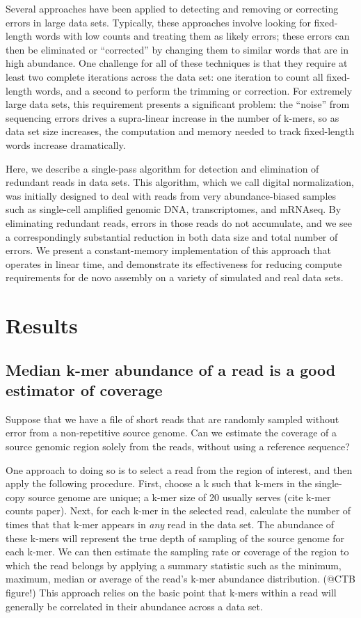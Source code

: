 \documentclass[10pt,draft]{article}
\begin{document}
Several approaches have been applied to detecting and removing or
correcting errors in large data sets.  Typically, these approaches
involve looking for fixed-length words with low counts and treating
them as likely errors; these errors can then be eliminated or
``corrected'' by changing them to similar words that are in high
abundance.  One challenge for all of these techniques is that they
require at least two complete iterations across the data set: one
iteration to count all fixed-length words, and a second to perform the
trimming or correction.  For extremely large data sets, this
requirement presents a significant problem: the ``noise'' from
sequencing errors drives a supra-linear increase in the number of
k-mers, so as data set size increases, the computation and memory
needed to track fixed-length words increase dramatically.

Here, we describe a single-pass algorithm for detection and
elimination of redundant reads in data sets.  This algorithm, which we
call digital normalization, was initially designed to deal with reads
from very abundance-biased samples such as single-cell amplified
genomic DNA, transcriptomes, and mRNAseq.  By eliminating redundant
reads, errors in those reads do not accumulate, and we see a
correspondingly substantial reduction in both data size and total
number of errors.  We present a constant-memory implementation of this
approach that operates in linear time, and demonstrate its
effectiveness for reducing compute requirements for de novo assembly
on a variety of simulated and real data sets.

\section*{Results}

\subsection*{Median k-mer abundance of a read is a good estimator of coverage}

Suppose that we have a file of short reads that are randomly sampled
without error from a non-repetitive source genome.  Can we estimate
the coverage of a source genomic region solely from the reads, without
using a reference sequence?

One approach to doing so is to select a read from the region of
interest, and then apply the following procedure. First, choose a k
such that k-mers in the single-copy source genome are unique; a k-mer
size of 20 usually serves (cite k-mer counts paper).  Next, for each
k-mer in the selected read, calculate the number of times that that
k-mer appears in {\em any} read in the data set.  The abundance of
these k-mers will represent the true depth of sampling of the source
genome for each k-mer.  We can then estimate the sampling rate or
coverage of the region to which the read belongs by applying a summary
statistic such as the minimum, maximum, median or average of the
read's k-mer abundance distribution. (@CTB figure!)  This approach
relies on the basic point that k-mers within a read will generally be
correlated in their abundance across a data set.
\end{document}
